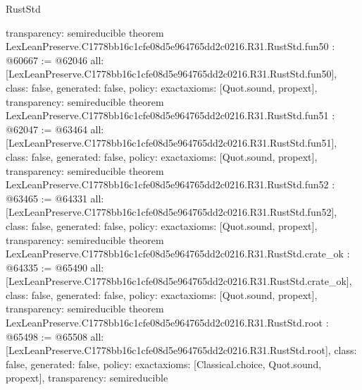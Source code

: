 \begin{lexlean}{RustStd}
\begin{coremodule}
{  transparency: semireducible
}
theorem LexLeanPreserve.C1778bb16c1cfe08d5e964765dd2c0216.R31.RustStd.fun50 : @60667 := @62046 {
  all: [LexLeanPreserve.C1778bb16c1cfe08d5e964765dd2c0216.R31.RustStd.fun50],
  class: false,
  generated: false,
  policy: exact{axioms: [Quot.sound, propext]},
  transparency: semireducible
}
theorem LexLeanPreserve.C1778bb16c1cfe08d5e964765dd2c0216.R31.RustStd.fun51 : @62047 := @63464 {
  all: [LexLeanPreserve.C1778bb16c1cfe08d5e964765dd2c0216.R31.RustStd.fun51],
  class: false,
  generated: false,
  policy: exact{axioms: [Quot.sound, propext]},
  transparency: semireducible
}
theorem LexLeanPreserve.C1778bb16c1cfe08d5e964765dd2c0216.R31.RustStd.fun52 : @63465 := @64331 {
  all: [LexLeanPreserve.C1778bb16c1cfe08d5e964765dd2c0216.R31.RustStd.fun52],
  class: false,
  generated: false,
  policy: exact{axioms: [Quot.sound, propext]},
  transparency: semireducible
}
theorem LexLeanPreserve.C1778bb16c1cfe08d5e964765dd2c0216.R31.RustStd.crate_ok : @64335 := @65490 {
  all: [LexLeanPreserve.C1778bb16c1cfe08d5e964765dd2c0216.R31.RustStd.crate_ok],
  class: false,
  generated: false,
  policy: exact{axioms: [Quot.sound, propext]},
  transparency: semireducible
}
theorem LexLeanPreserve.C1778bb16c1cfe08d5e964765dd2c0216.R31.RustStd.root : @65498 := @65508 {
  all: [LexLeanPreserve.C1778bb16c1cfe08d5e964765dd2c0216.R31.RustStd.root],
  class: false,
  generated: false,
  policy: exact{axioms: [Classical.choice, Quot.sound, propext]},
  transparency: semireducible
}


\end{coremodule}
\end{lexlean}
